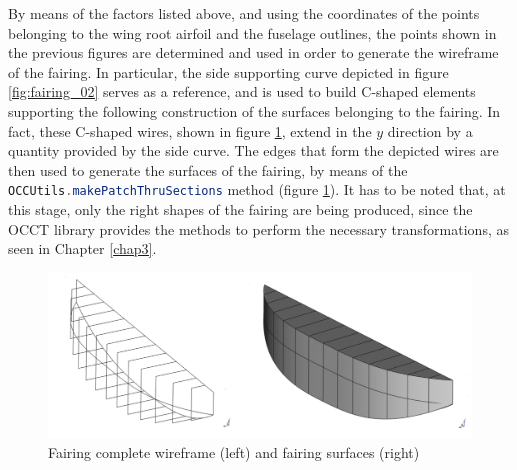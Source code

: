 \noindent
By means of the factors listed above, and using the coordinates of the points belonging to the wing root airfoil and the fuselage outlines, the points shown in the previous figures are determined and used in order to generate the wireframe of the fairing. In particular, the side supporting curve depicted in figure \ref{fig:fairing_02} serves as a reference, and is used to build C-shaped elements supporting the following construction of the surfaces belonging to the fairing. In fact, these C-shaped wires, shown in figure \ref{fig:FairingWireframeSupCurves}, extend in the $y$ direction by a quantity provided by the side curve. The edges that form the depicted wires are then used to generate the surfaces of the fairing, by means of the \lstinline[language=Java]!OCCUtils.makePatchThruSections! method (figure \ref{fig:FairingWireframeSupCurves}). It has to be noted that, at this stage, only the right shapes of the fairing are being produced, since the \gls{OCCT} library provides the methods to perform the necessary transformations, as seen in Chapter \ref{chap3}.    
%
\begin{figure}[H]
\centering
\includegraphics[scale=0.45]{Immagini/Appendice/Fairing/fairing_04}
\caption{Fairing complete wireframe (left) and fairing surfaces (right)}
\label{fig:FairingWireframeSupCurves}
\end{figure}
%  

